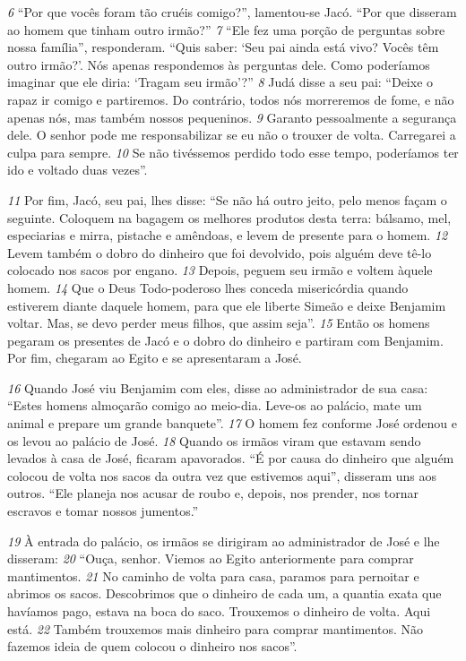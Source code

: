 \bigskip
\textit{\tiny 6}
“Por que vocês foram tão cruéis comigo?”, lamentou-se Jacó.
 “Por que
disseram ao homem que tinham outro irmão?” 
\textit{\tiny 7}
“Ele fez uma porção de perguntas sobre nossa família”, responderam. “Quis
saber: ‘Seu pai ainda está vivo? Vocês têm outro irmão?’. Nós apenas respondemos
às perguntas dele. Como poderíamos imaginar que ele diria: ‘Tragam seu irmão’?” 
\textit{\tiny 8}
Judá disse a seu pai: “Deixe o rapaz ir comigo e partiremos. Do contrário,
todos nós morreremos de fome, e não apenas nós, mas também nossos
pequeninos. 
\textit{\tiny 9} 
Garanto pessoalmente a segurança dele. O senhor pode me
responsabilizar se eu não o trouxer de volta. Carregarei a culpa para sempre. 
\textit{\tiny 10}
Se
não tivéssemos perdido todo esse tempo, poderíamos ter ido e voltado duas
vezes”.

\bigskip
\textit{\tiny 11}
Por  fim, Jacó, seu pai, lhes disse: “Se não há outro jeito, pelo menos façam o
seguinte. Coloquem na bagagem os melhores produtos desta terra: bálsamo, mel,
especiarias e mirra, pistache e amêndoas, e levem de presente para o homem.
\textit{\tiny 12}
Levem também o dobro do dinheiro que foi devolvido, pois alguém deve tê-lo
colocado nos sacos por engano. 
\textit{\tiny 13}
Depois, peguem seu irmão e voltem àquele
homem. 
\textit{\tiny 14}
Que o Deus Todo-poderoso
 lhes conceda misericórdia quando
estiverem diante daquele homem, para que ele liberte Simeão e deixe Benjamim
voltar. Mas, se devo perder meus filhos, que assim seja”.
\textit{\tiny 15}
Então os homens pegaram os presentes de Jacó e o dobro do dinheiro e
partiram com Benjamim. Por fim, chegaram ao Egito e se apresentaram a José.

\bigskip
\textit{\tiny 16}
Quando José viu Benjamim com eles, disse ao administrador de sua casa: “Estes
homens almoçarão comigo ao meio-dia. Leve-os ao palácio, mate um animal e
prepare um grande banquete”. 
\textit{\tiny 17}
O homem fez conforme José ordenou e os levou
ao palácio de José.
\textit{\tiny 18}
Quando os irmãos viram que estavam sendo levados à casa de José, ficaram
apavorados. “É por causa do dinheiro que alguém colocou de volta nos sacos da
outra vez que estivemos aqui”, disseram uns aos outros. “Ele planeja nos acusar de
roubo e, depois, nos prender, nos tornar escravos e tomar nossos jumentos.”

\bigskip
\textit{\tiny 19}
À entrada do palácio, os irmãos se dirigiram ao administrador de José e lhe
disseram: 
\textit{\tiny 20}
“Ouça, senhor. Viemos ao Egito anteriormente para comprar
mantimentos. 
\textit{\tiny 21}
No caminho de volta para casa, paramos para pernoitar e
abrimos os sacos. Descobrimos que o dinheiro de cada um, a quantia exata que
havíamos pago, estava na boca do saco. Trouxemos o dinheiro de volta. Aqui está.
\textit{\tiny 22}
Também trouxemos mais dinheiro para comprar mantimentos. Não fazemos
ideia de quem colocou o dinheiro nos sacos”.

